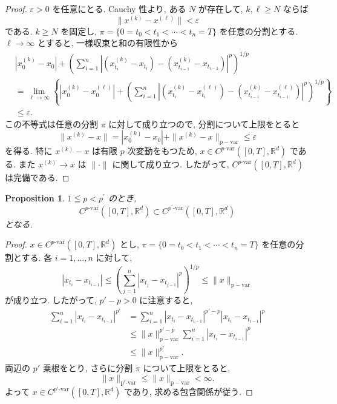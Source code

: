 \documentclass[11pt]{article}
\theoremstyle{breakstyle}
\newtheorem{proposition}[theorem]{Proposition}
\begin{document}
\begin{proof}
    $\varepsilon>0$ を任意にとる. Cauchy 性より, ある $N$ が存在して,
    $k,\ell\geq N$ ならば
    \begin{equation*}
        \|x^{(k)}-x^{(\ell)}\|<\varepsilon
    \end{equation*}
    である. $k\geq N$ を固定し,
    $\pi=\{0=t_0<t_1<\cdots<t_n=T\}$ を任意の分割とする.
    $\ell\to\infty$ とすると, 一様収束と和の有限性から
    \begin{align*}
        &|x_0^{(k)}-x_0|
        +\left(\sum_{i=1}^n
        |(x_{t_i}^{(k)}-x_{t_i})-(x_{t_{i-1}}^{(k)}-x_{t_{i-1}})|^p
        \right)^{1/p}\\
        &=\lim_{\ell\to\infty}\left\{
        |x_0^{(k)}-x_0^{(\ell)}|
        +\left(\sum_{i=1}^n
        |(x_{t_i}^{(k)}-x_{t_i}^{(\ell)})
        -(x_{t_{i-1}}^{(k)}-x_{t_{i-1}}^{(\ell)})|^p
        \right)^{1/p}\right\}\\
        &\leq \varepsilon.
    \end{align*}
    この不等式は任意の分割 $\pi$ に対して成り立つので,
    分割について上限をとると
    \begin{equation*}
        \|x^{(k)}-x\|
        =|x_0^{(k)}-x_0|+\|x^{(k)}-x\|_{\mathrm{p-var}}
        \leq\varepsilon
    \end{equation*}
    を得る. 特に $x^{(k)}-x$ は有限 $p$ 次変動をもつため,
    $x\in C^{p\text{-var}}([0,T],\mathbb{R}^d)$ である. また $x^{(k)}\to x$ は
    $\|\cdot\|$ に関して成り立つ. したがって,
    $C^{p\text{-var}}([0,T],\mathbb{R}^d)$ は完備である.
\end{proof}
\begin{proposition}
    $1\leqq p<p^\prime$ のとき, 
    \begin{equation*}
        C^{p\text{-var}}([0,T],\mathbb{R}^d)\subset C^{p^\prime\text{-var}}([0,T],\mathbb{R}^d)
    \end{equation*}
    となる.
\end{proposition}
\begin{proof}
    $x\in C^{p\text{-var}}([0,T],\mathbb{R}^d)$ とし,
    $\pi=\{0=t_0<t_1<\cdots<t_n=T\}$ を任意の分割とする.
    各 $i=1,\ldots,n$ に対して,
    \begin{equation*}
        |x_{t_i}-x_{t_{i-1}}|
        \leq
        \left(\sum_{j=1}^n|x_{t_j}-x_{t_{j-1}}|^p\right)^{1/p}
        \leq \|x\|_{\mathrm{p-var}}
    \end{equation*}
    が成り立つ. したがって, $p'-p>0$ に注意すると,
    \begin{align*}
        \sum_{i=1}^n|x_{t_i}-x_{t_{i-1}}|^{p'}
        &=\sum_{i=1}^n
        |x_{t_i}-x_{t_{i-1}}|^{p'-p}
        |x_{t_i}-x_{t_{i-1}}|^p\\
        &\leq
        \|x\|_{\mathrm{p-var}}^{p'-p}
        \sum_{i=1}^n|x_{t_i}-x_{t_{i-1}}|^p\\
        &\leq \|x\|_{\mathrm{p-var}}^{p'}.
    \end{align*}
    両辺の $p'$ 乗根をとり, さらに分割 $\pi$ について上限をとると,
    \begin{equation*}
        \|x\|_{\mathrm{p'\text{-var}}}
        \leq \|x\|_{\mathrm{p-var}}<\infty.
    \end{equation*}
    よって $x\in C^{p'\text{-var}}([0,T],\mathbb{R}^d)$ であり,
    求める包含関係が従う.
\end{proof}
\end{document}
